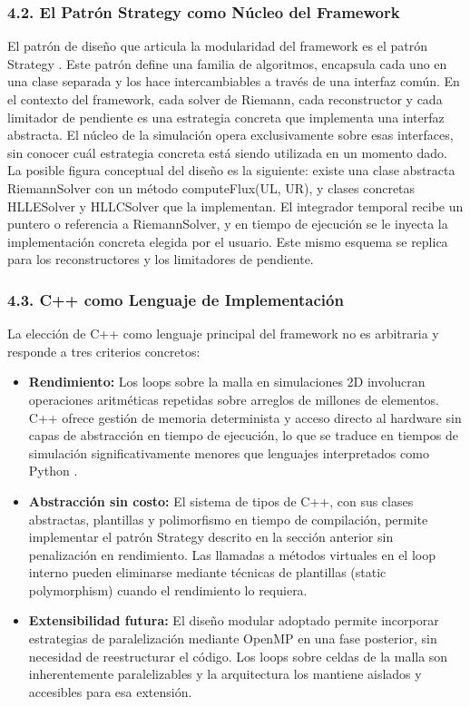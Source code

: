 \documentclass[11pt,openany]{book}
\begin{document}
\subsubsection{4.2. El Patrón Strategy como Núcleo del Framework}\textbf{}
 
El patrón de diseño que articula la modularidad del framework es el patrón Strategy \parencite{gamma1994design}. Este patrón define una familia de algoritmos, encapsula cada uno en una clase separada y los hace intercambiables a través de una interfaz común. En el contexto del framework, cada solver de Riemann, cada reconstructor y cada limitador de pendiente es una estrategia concreta que implementa una interfaz abstracta. El núcleo de la simulación opera exclusivamente sobre esas interfaces, sin conocer cuál estrategia concreta está siendo utilizada en un momento dado.
La posible figura conceptual del diseño es la siguiente: existe una clase abstracta RiemannSolver con un método computeFlux(UL, UR), y clases concretas HLLESolver y HLLCSolver que la implementan. El integrador temporal recibe un puntero o referencia a RiemannSolver, y en tiempo de ejecución se le inyecta la implementación concreta elegida por el usuario. Este mismo esquema se replica para los reconstructores y los limitadores de pendiente.

\subsubsection{4.3. C++ como Lenguaje de Implementación}\textbf{}

La elección de C++ como lenguaje principal del framework no es arbitraria y responde a tres criterios concretos:

\begin{itemize}
    \item \textbf{Rendimiento: }Los loops sobre la malla en simulaciones 2D involucran operaciones aritméticas repetidas sobre arreglos de millones de elementos. C++ ofrece gestión de memoria determinista y acceso directo al hardware sin capas de abstracción en tiempo de ejecución, lo que se traduce en tiempos de simulación significativamente menores que lenguajes interpretados como Python \parencite{bulka2000efficient}.
    \item \textbf{Abstracción sin costo: }El sistema de tipos de C++, con sus clases abstractas, plantillas y polimorfismo en tiempo de compilación, permite implementar el patrón Strategy descrito en la sección anterior sin penalización en rendimiento. Las llamadas a métodos virtuales en el loop interno pueden eliminarse mediante técnicas de plantillas (static polymorphism) cuando el rendimiento lo requiera.
    \item \textbf{Extensibilidad futura: }El diseño modular adoptado permite incorporar estrategias de paralelización mediante OpenMP en una fase posterior, sin necesidad de reestructurar el código. Los loops sobre celdas de la malla son inherentemente paralelizables y la arquitectura los mantiene aislados y accesibles para esa extensión.
\end{itemize}
\end{document}
